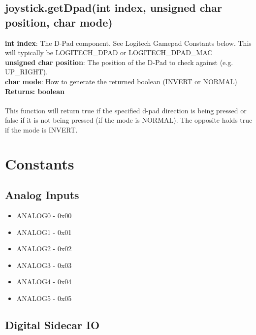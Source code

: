 \documentclass[11pt]{article} %
\begin{document}
\subsection{joystick.getDpad(int index, unsigned char position, char mode)}
\textbf{int index}: The D-Pad component. See Logitech Gamepad Constants below. This will typically be LOGITECH\_DPAD or LOGITECH\_DPAD\_MAC\\
\textbf{unsigned char position}: The position of the D-Pad to check against (e.g. UP\_RIGHT).\\
\textbf{char mode}: How to generate the returned boolean (INVERT or NORMAL)\\
\textbf{Returns: boolean}\\\\
This function will return true if the specified d-pad direction is being pressed or false if it is not being pressed (if the mode is NORMAL). The opposite holds true if the mode is INVERT.

\newpage
\section{Constants}

\subsection{Analog Inputs}
\begin{itemize}
\item ANALOG0 - 0x00
\item ANALOG1 - 0x01
\item ANALOG2 - 0x02
\item ANALOG3 - 0x03
\item ANALOG4 - 0x04
\item ANALOG5 - 0x05
\end{itemize}

\subsection{Digital Sidecar IO}
\end{document}

